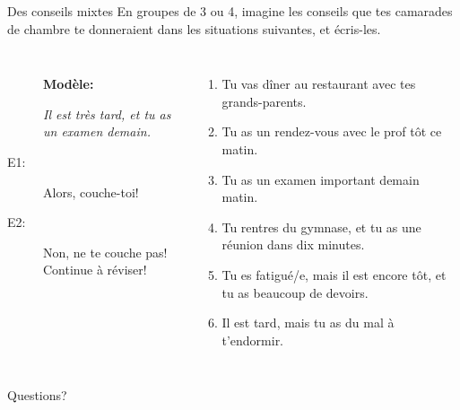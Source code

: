 \documentclass{beamer}
\begin{document}
  \begin{frame}{Des conseils mixtes}
    \small
    En groupes de 3 ou 4, imagine les conseils que tes camarades de chambre te donneraient dans les situations suivantes, et écris-les.\\
    \begin{columns}
        \begin{description}
          \item[] \textbf{Modèle:}
          \item[] \emph{Il est très tard, et tu as un examen demain.}
          \item[E1:] Alors, couche-toi!
          \item[E2:] Non, ne te couche pas! Continue à réviser!
        \end{description}
        \scriptsize
        \begin{enumerate}
          \item Tu vas dîner au restaurant avec tes grands-parents.
          \item Tu as un rendez-vous avec le prof tôt ce matin.
          \item Tu as un examen important demain matin.
          \item Tu rentres du gymnase, et tu as une réunion dans dix minutes.
          \item Tu es fatigué/e, mais il est encore tôt, et tu as beaucoup de devoirs.
          \item Il est tard, mais tu as du mal à t'endormir.
        \end{enumerate}
    \end{columns}
  \end{frame}

  \begin{frame}{}
    \begin{center}
      \Large Questions?
    \end{center}
  \end{frame}
\end{document}
